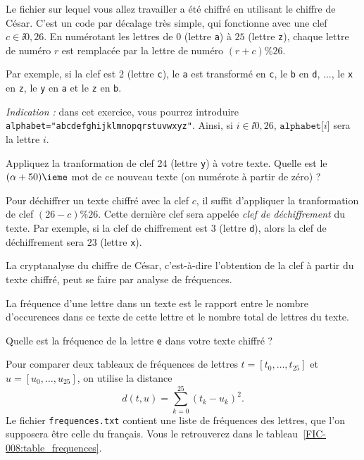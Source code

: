 Le fichier sur lequel vous allez travailler a été chiffré en utilisant le chiffre de César. C'est un code par décalage très simple, qui fonctionne avec une clef $c \in \ii{0,26}$. 
En numérotant les lettres de $0$ (lettre \texttt a) à $25$ (lettre \texttt z), chaque lettre de numéro $r$ est remplacée par la lettre de numéro $(r+c) \% 26$. 

Par exemple, si la clef est $2$ (lettre \texttt c), le \texttt a est transformé en \texttt c, le \texttt b en \texttt d, ..., le \texttt x en \texttt z, le \texttt y en \texttt a et le \texttt z en \texttt b.

\medskip{}

\emph{Indication :} dans cet exercice, vous pourrez introduire \texttt{alphabet="abcdefghijklmnopqrstuvwxyz"}. Ainsi, si $i\in \ii{0,26}$, $\texttt{alphabet[}i\texttt{]}$ sera la lettre \no$i$.

\medskip{}

\question{} Appliquez la tranformation de clef 24 (lettre \texttt y) à votre texte. Quelle est le $(\alpha+50)\ieme$ mot de ce nouveau texte (on numérote à partir de zéro) ?

\medskip{}

Pour déchiffrer un texte chiffré avec la clef $c$, il suffit d'appliquer la tranformation de clef $(26 - c) \% 26$. Cette dernière clef sera appelée \emph{clef de déchiffrement} du texte.
Par exemple, si la clef de chiffrement est $3$ (lettre \texttt d), alors la clef de déchiffrement sera $23$ (lettre \texttt x).

La cryptanalyse du chiffre de César, c'est-à-dire l'obtention de la clef à partir du texte chiffré, peut se faire par analyse de fréquences. 

La fréquence d'une lettre dans un texte est le rapport entre le nombre d'occurences dans ce texte de cette lettre et le nombre total de lettres du texte. 

\medskip{}

\question{} Quelle est la fréquence de la lettre \texttt{e} dans votre texte chiffré ? 

\medskip{}

Pour comparer deux tableaux de fréquences de lettres $t = [t_0,\dots,t_ {25}]$ et $u = [u_0,\dots,u_{25}]$, on utilise la distance 
\begin{equation*}
    d(t,u) = \sum_{k=0}^{25} (t_k-u_k)^2.
\end{equation*}
Le fichier \texttt{frequences.txt} contient une liste de fréquences des lettres, que l'on supposera être celle du français. Vous le retrouverez dans le tableau~\ref{FIC-008:table_frequences}. 


